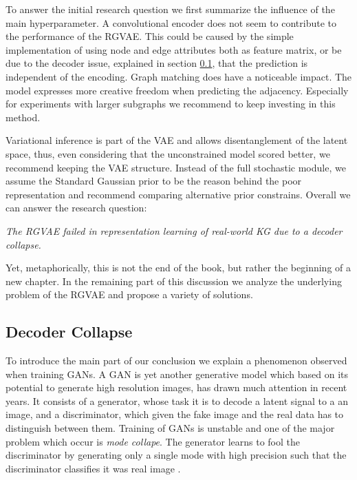 To answer the initial research question we first summarize the influence of the main hyperparameter.
A convolutional encoder does not seem to contribute to the performance of the RGVAE. This could be caused by the simple implementation of using node and edge attributes both as feature matrix, or be due to the decoder issue, explained in section \ref{ssec7:collapse}, that the prediction is independent of the encoding. 
Graph matching does have a noticeable impact. The model expresses more creative freedom when predicting the adjacency. Especially for experiments with larger subgraphs we recommend to keep investing in this method.

Variational inference is part of the VAE and allows disentanglement of the latent space, thus, even considering that the unconstrained model scored better, we recommend keeping the VAE structure. Instead of the full stochastic module, we assume the Standard Gaussian prior to be the reason behind the poor representation and recommend comparing alternative prior constrains.
Overall we can answer the research question:

\begin{center}
    \textit{The RGVAE failed in representation learning of real-world KG due to a decoder collapse.}
\end{center}

Yet, metaphorically, this is not the end of the book, but rather the beginning of a new chapter. In the remaining part of this discussion we analyze the underlying problem of the RGVAE and propose a variety of solutions.


\subsection{Decoder Collapse}
\label{ssec7:collapse}

To introduce the main part of our conclusion we explain a phenomenon observed when training GANs. A GAN is yet another generative model which based on its potential to generate high resolution images, has drawn much attention in recent years. It consists of a generator, whose task it is to decode a latent signal to a an image, and a discriminator, which given the fake image and the real data has to distinguish between them. Training of GANs is unstable and one of the major problem which occur is \textit{mode collape}. The generator learns to fool the discriminator by generating only a single mode with high precision such that the discriminator classifies it was real image \cite{goodfellow2014generative}.

